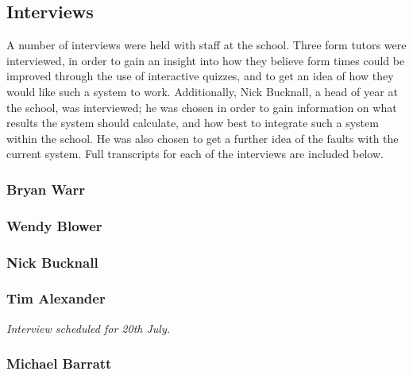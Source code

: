 \subsection{Interviews}

A number of interviews were held with staff at the school. Three form tutors were interviewed, in order to gain an insight into how they believe form times could be improved through the use of interactive quizzes, and to get an idea of how they would like such a system to work. Additionally, Nick Bucknall, a head of year at the school, was interviewed; he was chosen in order to gain information on what results the system should calculate, and how best to integrate such a system within the school. He was also chosen to get a further idea of the faults with the current system. Full transcripts for each of the interviews are included below.

\subsubsection{Bryan Warr}


\subsubsection{Wendy Blower}



\subsubsection{Nick Bucknall}



\subsubsection{Tim Alexander}

\textit{Interview scheduled for 20th July.}

\subsubsection{Michael Barratt}